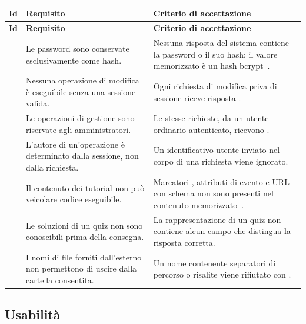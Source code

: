 \begin{longtable}{@{}l L{5.2cm} L{6.6cm}@{}}
\toprule
\textbf{Id} & \textbf{Requisito} & \textbf{Criterio di accettazione} \\
\midrule
\endfirsthead
\toprule
\textbf{Id} & \textbf{Requisito} & \textbf{Criterio di accettazione} \\
\midrule
\endhead
\bottomrule
\endlastfoot

 &
Le password sono conservate esclusivamente come hash. &
Nessuna risposta del sistema contiene la password o il suo hash; il valore
memorizzato è un hash bcrypt~\cite{provos1999}. \\

 &
Nessuna operazione di modifica è eseguibile senza una sessione valida. &
Ogni richiesta di modifica priva di sessione riceve risposta . \\

 &
Le operazioni di gestione sono riservate agli amministratori. &
Le stesse richieste, da un utente ordinario autenticato, ricevono . \\

 &
L'autore di un'operazione è determinato dalla sessione, non dalla richiesta. &
Un identificativo utente inviato nel corpo di una richiesta viene ignorato. \\

 &
Il contenuto dei tutorial non può veicolare codice eseguibile. &
Marcatori , attributi di evento e URL con schema 
non sono presenti nel contenuto memorizzato~\cite{owasp2021}. \\

 &
Le soluzioni di un quiz non sono conoscibili prima della consegna. &
La rappresentazione di un quiz non contiene alcun campo che distingua la
risposta corretta. \\

 &
I nomi di file forniti dall'esterno non permettono di uscire dalla cartella
consentita. &
Un nome contenente separatori di percorso o risalite viene rifiutato con
. \\

\end{longtable}

\subsection{Usabilità}

